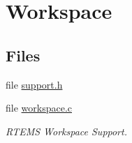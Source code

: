 \hypertarget{group__ClassicRTEMSWorkspace}{}\section{Workspace}
\label{group__ClassicRTEMSWorkspace}
\subsection*{Files}
\begin{DoxyCompactItemize}
\item 
file \mbox{\hyperlink{support_8h}{support.\+h}}
\item 
file \mbox{\hyperlink{workspace_8c}{workspace.\+c}}
\begin{DoxyCompactList}\small\item\em R\+T\+E\+MS Workspace Support. \end{DoxyCompactList}\end{DoxyCompactItemize}
